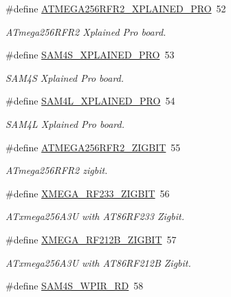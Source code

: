 \begin{DoxyCompactItemize}
\#define \mbox{\hyperlink{group__group__common__boards_ga3e5ed6ddb1fa4224ecf5b36e7cd726aa}{A\+T\+M\+E\+G\+A256\+R\+F\+R2\+\_\+\+X\+P\+L\+A\+I\+N\+E\+D\+\_\+\+P\+RO}}~52
\begin{DoxyCompactList}\small\item\em A\+Tmega256\+R\+F\+R2 Xplained Pro board. \end{DoxyCompactList}\item 
\#define \mbox{\hyperlink{group__group__common__boards_ga31908f76cb4f5381f944dde3b97a5321}{S\+A\+M4\+S\+\_\+\+X\+P\+L\+A\+I\+N\+E\+D\+\_\+\+P\+RO}}~53
\begin{DoxyCompactList}\small\item\em S\+A\+M4S Xplained Pro board. \end{DoxyCompactList}\item 
\#define \mbox{\hyperlink{group__group__common__boards_ga8eefa0fb47cd26ac426c9043067f20f3}{S\+A\+M4\+L\+\_\+\+X\+P\+L\+A\+I\+N\+E\+D\+\_\+\+P\+RO}}~54
\begin{DoxyCompactList}\small\item\em S\+A\+M4L Xplained Pro board. \end{DoxyCompactList}\item 
\#define \mbox{\hyperlink{group__group__common__boards_gaa9650ef6d0518c4b5d43b49b4425daa1}{A\+T\+M\+E\+G\+A256\+R\+F\+R2\+\_\+\+Z\+I\+G\+B\+IT}}~55
\begin{DoxyCompactList}\small\item\em A\+Tmega256\+R\+F\+R2 zigbit. \end{DoxyCompactList}\item 
\#define \mbox{\hyperlink{group__group__common__boards_ga1364d2c99873446ea8c511ec29f50a8f}{X\+M\+E\+G\+A\+\_\+\+R\+F233\+\_\+\+Z\+I\+G\+B\+IT}}~56
\begin{DoxyCompactList}\small\item\em A\+Txmega256\+A3U with A\+T86\+R\+F233 Zigbit. \end{DoxyCompactList}\item 
\#define \mbox{\hyperlink{group__group__common__boards_ga20a411444544310ebe985657fb431f33}{X\+M\+E\+G\+A\+\_\+\+R\+F212\+B\+\_\+\+Z\+I\+G\+B\+IT}}~57
\begin{DoxyCompactList}\small\item\em A\+Txmega256\+A3U with A\+T86\+R\+F212B Zigbit. \end{DoxyCompactList}\item 
\#define \mbox{\hyperlink{group__group__common__boards_ga05f802b13754324622c34537b0c7a607}{S\+A\+M4\+S\+\_\+\+W\+P\+I\+R\+\_\+\+RD}}~58

\end{DoxyCompactItemize}
